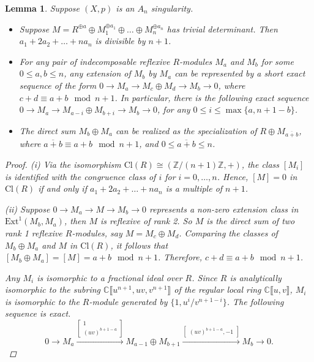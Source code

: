 \documentclass{amsart}[12pt]
\newtheorem{lemma}[theorem]{Lemma}
\theoremstyle{definition}
\theoremstyle{remark}
\numberwithin{equation}{section}
\begin{document}
\begin{lemma}\label{an} Suppose $(X, p)$ is an $A_n$ singularity.
\begin{itemize}
\item[(i)] Suppose $M = R^{\oplus a} \oplus M_1^{\oplus a_1} \oplus \dots \oplus M_n^{\oplus a_{n}}$ has trivial determinant. Then $a_1 + 2a_2 + \dots + na_n$ is divisible by $n + 1$.
\item[(ii)] For any pair of indecomposable reflexive $R$-modules $M_a$ and $M_b$ for some $0 \leq a, b \leq n$, any extension of $M_b$ by $M_a$ can be represented by a short exact sequence of the form $0 \to M_a \to M_{c} \oplus M_{d} \to M_b \to 0$,
where $c + d \equiv a + b \mod n + 1$. In particular, there is the following exact sequence $0 \to M_a \to M_{a - i} \oplus M_{b + i} \to M_b \to 0$, for any $0 \leq i \leq \max\{a, n + 1 - b\}$. 
\item[(iii)] The direct sum $M_b \oplus M_a$ can be realized as the specialization of $R \oplus M_{\overline{a + b}}$, where $\overline{a + b} \equiv a + b \mod n + 1$, and $0 \leq \overline{a + b} \leq n$. 
\end{itemize}
\begin{proof}
(i) Via the isomorphism $\mathrm{Cl}(R) \cong (\mathbb{Z}/(n + 1)\mathbb{Z}, +)$, the class $[M_i]$ is identified with the congruence class of $i$ for $i = 0, \dots, n$. Hence, $[M] = 0$ in $\mathrm{Cl}(R)$ if and only if $a_1 + 2a_2 + \dots + na_n$ is a multiple of $n + 1$.

(ii) Suppose $0 \to M_a \to M \to M_b \to 0$ represents a non-zero extension class in $\mathrm{Ext}^1(M_b, M_a)$, then $M$ is reflexive of rank 2. So $M$ is the direct sum of two rank 1 reflexive $R$-modules, say $M = M_c \oplus M_d$. Comparing the classes of $M_b \oplus M_a$ and $M$ in $\mathrm{Cl}(R)$, it follows that $[M_b \oplus M_a] = [M] = a + b \mod n + 1$. Therefore, $c + d \equiv a + b \mod n + 1$.

Any $M_i$ is isomorphic to a fractional ideal over $R$. Since $R$ is analytically isomorphic to the subring $\mathbb{C}\llbracket u^{n + 1}, uv, v^{n + 1}\rrbracket$ of the regular local ring $\mathbb{C}\llbracket u, v\rrbracket$,  $M_i$ is isomorphic to the $R$-module generated by $\{1, u^i/v^{n + 1 - i}\}$. The following sequence is exact.
\begin{equation}\label{consecutive}
0 \to M_a \xrightarrow{\begin{bmatrix} 1 \\ (uv)^{b + 1 - a} \end{bmatrix}} M_{a - 1} \oplus M_{b + 1} \xrightarrow{\begin{bmatrix}(uv)^{b + 1 - a}, -1 \end{bmatrix}} M_b \to 0.
\end{equation}


\end{proof}
\end{lemma}
\end{document}
